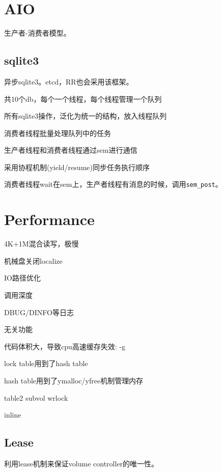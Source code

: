 \section{AIO}

生产者-消费者模型。

\subsection{sqlite3}

异步sqlite3。etcd，RR也会采用该框架。

\begin{compactitem}
    \item 共10个db，每个一个线程，每个线程管理一个队列
    \item 所有sqlite3操作，泛化为统一的结构，放入线程队列
    \item 消费者线程批量处理队列中的任务
    \item 生产者线程和消费者线程通过sem进行通信
    \item 采用协程机制(yield/resume)同步任务执行顺序
\end{compactitem}

消费者线程wait在sem上，生产者线程有消息的时候，调用\verb|sem_post|。

\section{Performance}

4K+1M混合读写，极慢

机械盘关闭localize

IO路径优化
\begin{enumbox}
\item 调用深度
\item DBUG/DINFO等日志
\item 无关功能
\item 代码体积大，导致cpu高速缓存失效: -g
\item lock table用到了hash table
\item hash table用到了ymalloc/yfree机制管理内存
\item table2 subvol wrlock
\item inline
\end{enumbox}

\subsection{Lease}

利用lease机制来保证volume controller的唯一性。

